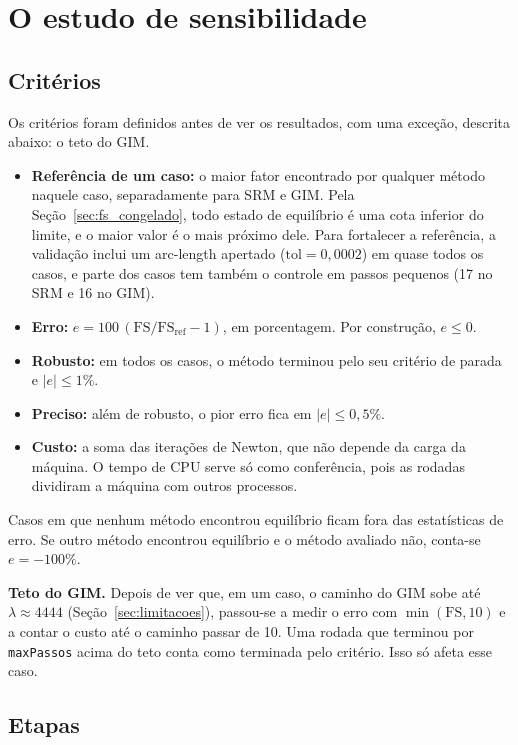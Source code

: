 \documentclass[11pt,a4paper]{article}
\numberwithin{equation}{section}
\begin{document}
\section{O estudo de sensibilidade}\label{sec:estudo}

\subsection{Critérios}

Os critérios foram definidos antes de ver os resultados, com uma exceção, descrita abaixo: o teto do GIM.
\begin{itemize}
\item \textbf{Referência de um caso:} o maior fator encontrado por qualquer método naquele caso, separadamente para SRM e GIM. Pela Seção~\ref{sec:fs_congelado}, todo estado de equilíbrio é uma cota inferior do limite, e o maior valor é o mais próximo dele. Para fortalecer a referência, a validação inclui um arc-length apertado ($\mathrm{tol} = 0{,}0002$) em quase todos os casos, e parte dos casos tem também o controle em passos pequenos (17 no SRM e 16 no GIM).
\item \textbf{Erro:} $e = 100\,(\mathrm{FS}/\mathrm{FS}_{\mathrm{ref}} - 1)$, em porcentagem. Por construção, $e \le 0$.
\item \textbf{Robusto:} em todos os casos, o método terminou pelo seu critério de parada e $|e| \le 1\%$.
\item \textbf{Preciso:} além de robusto, o pior erro fica em $|e| \le 0{,}5\%$.
\item \textbf{Custo:} a soma das iterações de Newton, que não depende da carga da máquina. O tempo de CPU serve só como conferência, pois as rodadas dividiram a máquina com outros processos.
\end{itemize}
Casos em que nenhum método encontrou equilíbrio ficam fora das estatísticas de erro. Se outro método encontrou equilíbrio e o método avaliado não, conta-se $e = -100\%$.

\textbf{Teto do GIM.} Depois de ver que, em um caso, o caminho do GIM sobe até $\lambda \approx 4444$ (Seção~\ref{sec:limitacoes}), passou-se a medir o erro com $\min(\mathrm{FS},10)$ e a contar o custo até o caminho passar de 10. Uma rodada que terminou por \texttt{maxPassos} acima do teto conta como terminada pelo critério. Isso só afeta esse caso.

\subsection{Etapas}
\end{document}
